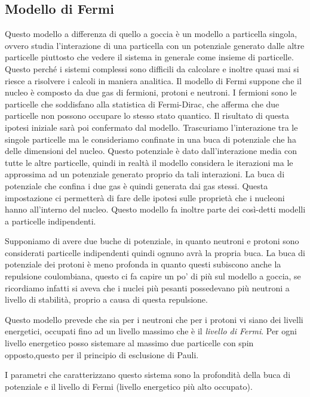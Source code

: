 \subsection{Modello di Fermi}
Questo modello a differenza di quello a goccia è un modello a particella singola, ovvero studia l'interazione di una particella con un potenziale generato dalle altre particelle piuttosto che vedere il sistema in generale come insieme di particelle.
Questo perché i sistemi complessi sono difficili da calcolare e inoltre quasi mai si riesce a risolvere i calcoli in maniera analitica.
Il modello di Fermi suppone che il nucleo è composto da due gas di fermioni, protoni e neutroni.
I fermioni sono le particelle che soddisfano alla statistica di Fermi-Dirac, che afferma che due particelle non possono occupare lo stesso stato quantico.
Il risultato di questa ipotesi iniziale sarà poi confermato dal modello.
Trascuriamo l'interazione tra le singole particelle ma le consideriamo confinate in una buca di potenziale che ha delle dimensioni del nucleo.
Questo potenziale è dato dall'interazione media con tutte le altre particelle, quindi in realtà il modello considera le iterazioni ma le approssima ad un potenziale generato proprio da tali  interazioni.
La buca di potenziale che confina i due gas è quindi generata dai gas stessi.
Questa impostazione ci permetterà di fare delle ipotesi sulle proprietà che i nucleoni hanno all'interno del nucleo.
Questo modello fa inoltre parte dei così-detti modelli a particelle indipendenti.

Supponiamo di avere due buche di potenziale, in quanto neutroni e protoni sono considerati particelle indipendenti quindi ognuno avrà la propria buca.
La buca di potenziale dei protoni è meno profonda in quanto questi subiscono anche la repulsione coulombiana, questo ci fa capire un po' di più sul modello a goccia, se ricordiamo infatti si aveva che i nuclei più pesanti possedevano più neutroni a livello di stabilità, proprio a causa di questa repulsione.

Questo modello prevede che sia per i neutroni che per i protoni vi siano dei livelli energetici, occupati fino ad un livello massimo che è il \emph{livello di Fermi}.
Per ogni livello energetico posso sistemare al massimo due particelle con spin opposto,questo per il principio di esclusione di Pauli.

I parametri che caratterizzano questo sistema sono la profondità della buca di potenziale e il livello di Fermi (livello energetico più alto occupato).

